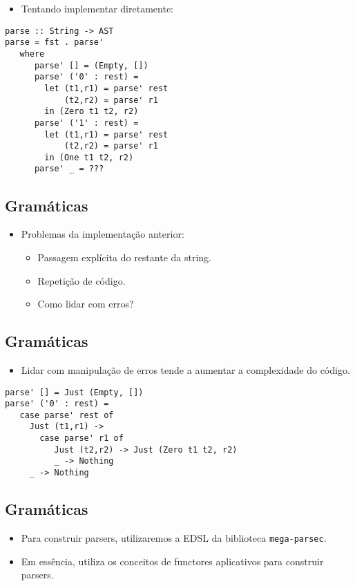 \documentclass[11pt]{article}
\begin{document}
\begin{itemize}
\item Tentando implementar diretamente:
\end{itemize}

\begin{verbatim}
parse :: String -> AST
parse = fst . parse'
   where
      parse' [] = (Empty, [])
      parse' ('0' : rest) = 
        let (t1,r1) = parse' rest
            (t2,r2) = parse' r1 
        in (Zero t1 t2, r2)
      parse' ('1' : rest) = 
        let (t1,r1) = parse' rest
            (t2,r2) = parse' r1 
        in (One t1 t2, r2)
      parse' _ = ???
\end{verbatim}
\subsection*{Gramáticas}
\label{sec:orgcdb7b79}

\begin{itemize}
\item Problemas da implementação anterior:
\begin{itemize}
\item Passagem explícita do restante da string.
\item Repetição de código.
\item Como lidar com erros?
\end{itemize}
\end{itemize}
\subsection*{Gramáticas}
\label{sec:orgae2dd6c}

\begin{itemize}
\item Lidar com manipulação de erros tende a
aumentar a complexidade do código.
\end{itemize}

\begin{verbatim}
parse' [] = Just (Empty, [])
parse' ('0' : rest) =
   case parse' rest of
     Just (t1,r1) ->
       case parse' r1 of
          Just (t2,r2) -> Just (Zero t1 t2, r2)
          _ -> Nothing 
     _ -> Nothing
\end{verbatim}
\subsection*{Gramáticas}
\label{sec:orgb0c6cff}

\begin{itemize}
\item Para construir parsers, utilizaremos a EDSL da biblioteca \texttt{mega-parsec}.

\item Em essência, utiliza os conceitos de functores aplicativos para
construir parsers.
\end{itemize}
\end{document}
